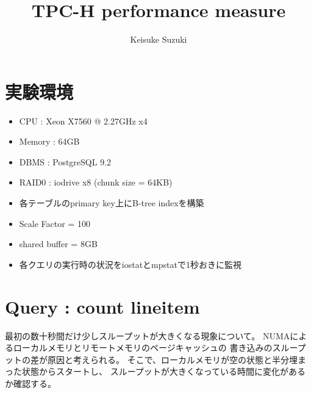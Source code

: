 \documentclass[11pt,a4paper]{jsarticle}
\title{TPC-H performance measure}
\author{Keisuke Suzuki}
\begin{document}
\maketitle
\section{実験環境}
\begin{itemize}
 \item CPU : Xeon X7560 @ 2.27GHz x4
 \item Memory : 64GB
 \item DBMS : PostgreSQL 9.2
 \item RAID0 : iodrive x8 (chunk size = 64KB)
 \item 各テーブルのprimary key上にB-tree indexを構築
 \item Scale Factor = 100
 \item shared buffer = 8GB
 \item 各クエリの実行時の状況をiostatとmpstatで1秒おきに監視
\end{itemize}

\clearpage
\section{Query : count lineitem}
最初の数十秒間だけ少しスループットが大きくなる現象について。
NUMAによるローカルメモリとリモートメモリのページキャッシュの
書き込みのスループットの差が原因と考えられる。
そこで、ローカルメモリが空の状態と半分埋まった状態からスタートし、
スループットが大きくなっている時間に変化があるか確認する。
\end{document}
